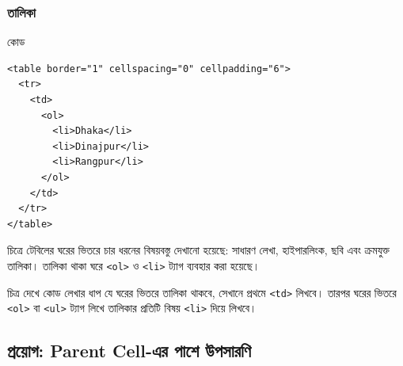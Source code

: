 \subsubsection{তালিকা}
\par\noindent
\begin{minipage}[t]{.52\linewidth}\vspace{0pt}\small
\begin{chFourWholeExample}{কোড}
\begin{verbatim}
<table border="1" cellspacing="0" cellpadding="6">
  <tr>
    <td>
      <ol>
        <li>Dhaka</li>
        <li>Dinajpur</li>
        <li>Rangpur</li>
      </ol>
    </td>
  </tr>
</table>
\end{verbatim}
\end{chFourWholeExample}
\end{minipage}\hfill
\begin{minipage}[t]{.44\linewidth}\vspace{0pt}\small
{}
চিত্রে টেবিলের ঘরের ভিতরে চার ধরনের বিষয়বস্তু দেখানো হয়েছে: সাধারণ লেখা, হাইপারলিংক, ছবি এবং ক্রমযুক্ত তালিকা। তালিকা থাকা ঘরে \texttt{<ol>} ও \texttt{<li>} ট্যাগ ব্যবহার করা হয়েছে।

\begin{keypointbox}{চিত্র দেখে কোড লেখার ধাপ}
যে ঘরের ভিতরে তালিকা থাকবে, সেখানে প্রথমে \texttt{<td>} লিখবে। তারপর ঘরের ভিতরে \texttt{<ol>} বা \texttt{<ul>} ট্যাগ লিখে তালিকার প্রতিটি বিষয় \texttt{<li>} দিয়ে লিখবে।
\end{keypointbox}
\end{minipage}\par\smallskip

\subsection{প্রয়োগ: Parent Cell-এর পাশে উপসারণি}

